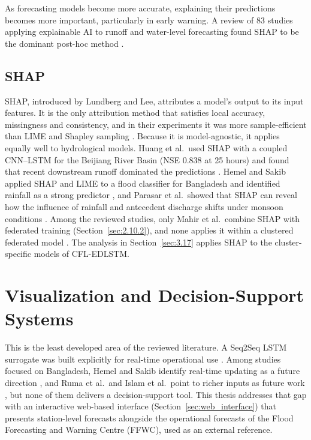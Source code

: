 As forecasting models become more accurate, explaining their predictions
becomes more important, particularly in early warning. A review of 83 studies
applying explainable AI to runoff and water-level forecasting found SHAP to be
the dominant post-hoc method \cite{Khorrami2025}.

\subsection{SHAP}
\label{sec:2.12.1}

SHAP, introduced by Lundberg and Lee, attributes a model's output to its input
features. It is the only attribution method that satisfies local accuracy,
missingness and consistency, and in their experiments it was more
sample-efficient than LIME and Shapley sampling \cite{Lundberg2017}. Because it
is model-agnostic, it applies equally well to hydrological models. Huang et
al.\ used SHAP with a coupled CNN--LSTM for the Beijiang River Basin (NSE 0.838
at 25 hours) and found that recent downstream runoff dominated the predictions
\cite{Huang2024}. Hemel and Sakib applied SHAP and LIME to a flood classifier
for Bangladesh and identified rainfall as a strong predictor
\cite{HemelSakib2024}, and Parasar et al.\ showed that SHAP can reveal how the
influence of rainfall and antecedent discharge shifts under monsoon conditions
\cite{Parasar2025}. Among the reviewed studies, only Mahir et al.\ combine SHAP
with federated training (Section~\ref{sec:2.10.2}), and none applies it within a
clustered federated model \cite{Mahir2025}. The analysis in
Section~\ref{sec:3.17} applies SHAP to the cluster-specific models of
CFL-EDLSTM.

\section{Visualization and Decision-Support Systems}
\label{sec:2.13}

This is the least developed area of the reviewed literature. A Seq2Seq LSTM
surrogate was built explicitly for real-time operational use \cite{Lim2025}.
Among studies focused on Bangladesh, Hemel and Sakib identify real-time
updating as a future direction \cite{HemelSakib2024}, and Ruma et al.\ and
Islam et al.\ point to richer inputs as future work
\cite{Ruma2023,Islam2026a}, but none of them delivers a decision-support tool.
This thesis addresses that gap with an interactive web-based interface
(Section~\ref{sec:web_interface}) that presents station-level forecasts
alongside the operational forecasts of the Flood Forecasting and Warning
Centre (FFWC), used as an external reference.

